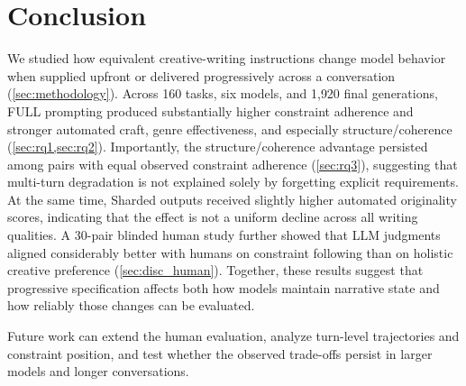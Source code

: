 \section{Conclusion}
\label{sec:conclusion}

We studied how equivalent creative-writing instructions change model behavior when supplied upfront or delivered progressively across a conversation (\cref{sec:methodology}). Across 160 tasks, six models, and 1{,}920 final generations, FULL prompting produced substantially higher constraint adherence and stronger automated craft, genre effectiveness, and especially structure/coherence (\cref{sec:rq1,sec:rq2}). Importantly, the structure/coherence advantage persisted among pairs with equal observed constraint adherence (\cref{sec:rq3}), suggesting that multi-turn degradation is not explained solely by forgetting explicit requirements. At the same time, Sharded outputs received slightly higher automated originality scores, indicating that the effect is not a uniform decline across all writing qualities. A 30-pair blinded human study further showed that LLM judgments aligned considerably better with humans on constraint following than on holistic creative preference (\cref{sec:disc_human}). Together, these results suggest that progressive specification affects both how models maintain narrative state and how reliably those changes can be evaluated.

Future work can extend the human evaluation, analyze turn-level trajectories and constraint position, and test whether the observed trade-offs persist in larger models and longer conversations.
